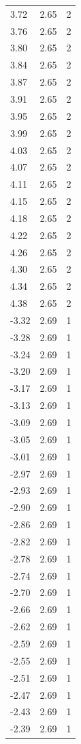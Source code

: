 \begin{longtable}{lrr}
  3.72 & 2.65 & 2 \\
  3.76 & 2.65 & 2 \\
  3.80 & 2.65 & 2 \\
  3.84 & 2.65 & 2 \\
  3.87 & 2.65 & 2 \\
  3.91 & 2.65 & 2 \\
  3.95 & 2.65 & 2 \\
  3.99 & 2.65 & 2 \\
  4.03 & 2.65 & 2 \\
  4.07 & 2.65 & 2 \\
  4.11 & 2.65 & 2 \\
  4.15 & 2.65 & 2 \\
  4.18 & 2.65 & 2 \\
  4.22 & 2.65 & 2 \\
  4.26 & 2.65 & 2 \\
  4.30 & 2.65 & 2 \\
  4.34 & 2.65 & 2 \\
  4.38 & 2.65 & 2 \\
  -3.32 & 2.69 & 1 \\
  -3.28 & 2.69 & 1 \\
  -3.24 & 2.69 & 1 \\
  -3.20 & 2.69 & 1 \\
  -3.17 & 2.69 & 1 \\
  -3.13 & 2.69 & 1 \\
  -3.09 & 2.69 & 1 \\
  -3.05 & 2.69 & 1 \\
  -3.01 & 2.69 & 1 \\
  -2.97 & 2.69 & 1 \\
  -2.93 & 2.69 & 1 \\
  -2.90 & 2.69 & 1 \\
  -2.86 & 2.69 & 1 \\
  -2.82 & 2.69 & 1 \\
  -2.78 & 2.69 & 1 \\
  -2.74 & 2.69 & 1 \\
  -2.70 & 2.69 & 1 \\
  -2.66 & 2.69 & 1 \\
  -2.62 & 2.69 & 1 \\
  -2.59 & 2.69 & 1 \\
  -2.55 & 2.69 & 1 \\
  -2.51 & 2.69 & 1 \\
  -2.47 & 2.69 & 1 \\
  -2.43 & 2.69 & 1 \\
  -2.39 & 2.69 & 1 \\

\end{longtable}
